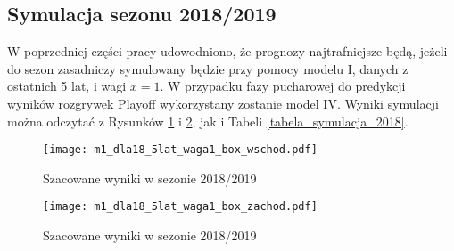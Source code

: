 \documentclass[inzynierska]{pwr_wmat_praca_dyplomowa}
\theoremstyle{plain}
\numberwithin{theorem}{chapter}
\theoremstyle{definition}
\numberwithin{theorem}{chapter}
\begin{document}
\subsection{Symulacja sezonu 2018/2019}
W poprzedniej części pracy udowodniono, że prognozy najtrafniejsze będą, jeżeli do sezon zasadniczy symulowany będzie przy pomocy modelu I, danych z ostatnich 5 lat, i wagi $x=1$. W przypadku fazy pucharowej do predykcji wyników rozgrywek Playoff wykorzystany zostanie model IV. Wyniki symulacji można odczytać z Rysunków \ref{m1_dla18_5lat_waga1_box_wschod} i \ref{m1_dla18_5lat_waga1_box_zachod}, jak i Tabeli \ref{tabela_symulacja_2018}.
\begin{figure}[t]
	\hspace*{-3cm}  
	\texttt{[image: m1\_dla18\_5lat\_waga1\_box\_wschod.pdf]}
	\caption{Szacowane wyniki w sezonie 2018/2019}
	\label{m1_dla18_5lat_waga1_box_wschod}
	\centering
\end{figure}
\begin{figure}[t]
	\hspace*{-3cm}  
	\texttt{[image: m1\_dla18\_5lat\_waga1\_box\_zachod.pdf]}
	\caption{Szacowane wyniki w sezonie 2018/2019}
	\label{m1_dla18_5lat_waga1_box_zachod}
	\centering
\end{figure}
\end{document}
